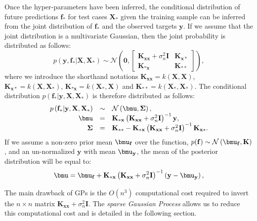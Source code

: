 \documentclass[useAMS,usenatbib,fleqn]{mn2e}
\begin{document}
Once the hyper-parameters have been inferred, the conditional distribution of future predictions $\mathbf{f}_{*}$ for test cases $\mathbf{X}_{*}$ given the training sample can be inferred from the joint distribution of $\mathbf{f}_{*}$ and the observed targets $\mathbf{y}$. If we assume that the joint distribution is a multivariate Gaussian, then the joint probability is distributed as follows:
\begin{equation}
p\left ( \mathbf{y},\mathbf{f}_{*}|\mathbf{X},\mathbf{X}_{*}\right) \sim \mathcal{N} \left ( \mathbf{0}, \begin{bmatrix}\mathbf{K_{xx}}+\sigma_{n}^{2}\mathbf{I} & \mathbf{K_{x*}}\\\mathbf{K_{*x}} & \mathbf{K_{**}} \end{bmatrix}\right ),
\end{equation}
where we introduce the shorthand notations $\mathbf{K_{xx}}=k\left(\mathbf{X},\mathbf{X}\right)$, $\mathbf{K_{x*}}=k\left(\mathbf{X},\mathbf{X}_{*}\right)$, $\mathbf{K_{*x}}=k\left(\mathbf{X}_{*},\mathbf{X}\right)$ and $\mathbf{K_{**}}=k\left(\mathbf{X}_{*},\mathbf{X}_{*}\right)$. The conditional distribution $p\left(\mathbf{f}_{*}|\mathbf{y},\mathbf{X},\mathbf{X}_{*}\right)$ is therefore distributed as follows:
\begin{equation}
\begin{array}{rcl}
p\left(\mathbf{f}_{*}|\mathbf{y},\mathbf{X},\mathbf{X}_{*}\right)		&	\sim		&	\mathcal{N} \left ( \bmu, \mathbf\Sigma \right ),\\
\bmu			&	=		&	\mathbf{K_{*x}}\left(\mathbf{K_{xx}}+\sigma_{n}^{2}\mathbf{I}\right)^{-1}\mathbf{y},\\
\mathbf\Sigma		&	=		&	\mathbf{K_{**}}-\mathbf{K_{*x}}\left(\mathbf{K_{xx}}+\sigma_{n}^{2}\mathbf{I}\right)^{-1}\mathbf{K_{x*}}.
\end{array}
\label{eq-posterior-of-f}
\end{equation}
If we assume a non-zero prior mean $\bmu_{\mathbf{f}}$ over the function, $p(\mathbf{f})\sim\mathcal{N}\left(\bmu_{\mathbf{f}},\mathbf{K}\right)$, and an un-normalized $\mathbf{y}$ with mean $\bmu_{\mathbf{y}}$, the mean of the posterior distribution will be equal to:
\begin{equation}
\bmu	 = \bmu_{\mathbf{f}}+\mathbf{K_{*x}}\left(\mathbf{K_{xx}}+\sigma_{n}^{2}\mathbf{I}\right)^{-1}\left(\mathbf{y}-\bmu_{\mathbf{y}}\right),
\label{eq-conditional-distribution}
\end{equation}

The main drawback of GPs is the $O\left(n^{3}\right)$ computational cost required to invert the $n\times n$ matrix $\mathbf{K_{xx}}+\sigma_{n}^{2}\mathbf{I}$. The \emph{sparse Gaussian Process} allows us to reduce this computational cost and is detailed in the following section.
\end{document}
